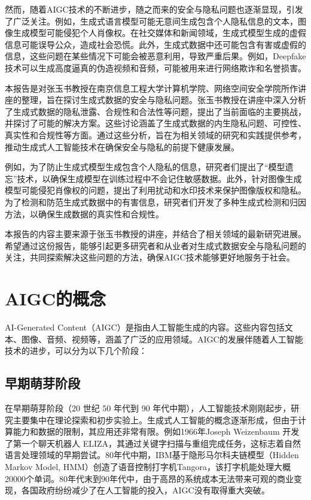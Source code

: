 \documentclass[a4paper]{nuist}
\begin{document}
然而，随着AIGC技术的不断进步，随之而来的安全与隐私问题也逐渐显现，引发了广泛关注。例如，生成式语言模型可能无意间生成包含个人隐私信息的文本，图像生成模型可能侵犯个人肖像权。在社交媒体和新闻领域，生成式模型生成的虚假信息可能误导公众，造成社会恐慌。此外，生成式数据中还可能包含有害或虚假的信息，这些问题在某些情况下可能会被恶意利用，导致严重后果。例如，Deepfake 技术可以生成高度逼真的伪造视频和音频，可能被用来进行网络欺诈和名誉损害。

本报告是对张玉书教授在南京信息工程大学计算机学院、网络空间安全学院所作讲座的整理，旨在探讨生成式数据的安全与隐私问题。张玉书教授在讲座中深入分析了生成式数据的隐私泄露、合规性和合法性等问题，提出了当前面临的主要挑战，并探讨了可能的解决方案。这些讨论涵盖了生成式数据的内生隐私问题、可控性、真实性和合规性等方面。通过这些分析，旨在为相关领域的研究和实践提供参考，推动生成式人工智能技术在确保安全与隐私的前提下健康发展。

例如，为了防止生成式模型生成包含个人隐私的信息，研究者们提出了“模型遗忘”技术，以确保生成模型在训练过程中不会记住敏感数据。此外，针对图像生成模型可能侵犯肖像权的问题，提出了利用扰动和水印技术来保护图像版权和隐私。为了检测和防范生成式数据中的有害信息，研究者们开发了多种生成式检测和归因方法，以确保生成数据的真实性和合规性。

本报告的内容主要来源于张玉书教授的讲座，并结合了相关领域的最新研究进展。希望通过这份报告，能够引起更多研究者和从业者对生成式数据安全与隐私问题的关注，共同探索解决这些问题的方法，确保AIGC技术能够更好地服务于社会。

\section{AIGC的概念}

AI-Generated Content（AIGC）是指由人工智能生成的内容。这些内容包括文本、图像、音频、视频等，涵盖了广泛的应用领域。AIGC的发展伴随着人工智能技术的进步，可以分为以下几个阶段：

\subsection{早期萌芽阶段}

在早期萌芽阶段（20 世纪 50 年代到 90 年代中期），人工智能技术刚刚起步，研究主要集中在理论探索和初步实验上。生成式人工智能的概念逐渐形成，但由于计算能力和数据的限制，其应用还非常有限。例如1966年Joseph Weizenbaum 开发了第一个聊天机器人 ELIZA\cite{ELIZAWik55:online}，其通过关键字扫描与重组完成任务，这标志着自然语言处理领域的早期尝试。80年代中期，IBM基于隐形马尔科夫链模型（Hidden Markov Model, HMM）\cite{eddy1996hidden}创造了语音控制打字机Tangora\cite{AlbertTa6:online}，该打字机能处理大概20000个单词。80年代末到90年代中，由于高昂的系统成本无法带来可观的商业变现，各国政府纷纷减少了在人工智能的投入，AIGC没有取得重大突破。
\end{document}

